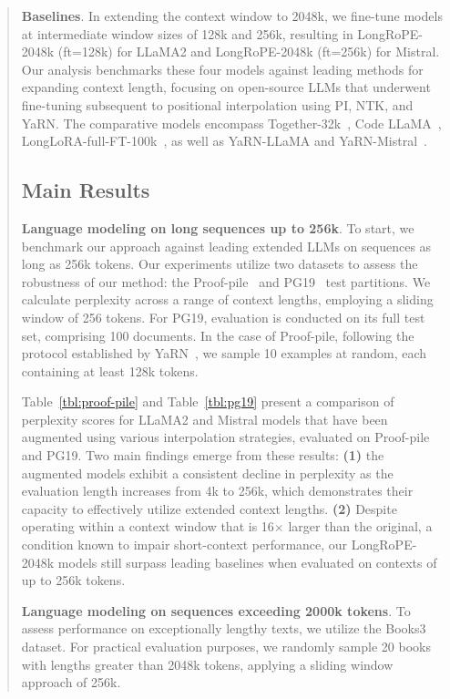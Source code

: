 \begin{abstract}
\textbf{Baselines}. In extending the context window to 2048k, we fine-tune models at intermediate window sizes of 128k and 256k, resulting in LongRoPE-2048k (ft=128k) for LLaMA2 and LongRoPE-2048k (ft=256k) for Mistral. Our analysis benchmarks these four models against leading methods for expanding context length, focusing on open-source LLMs that underwent fine-tuning subsequent to positional interpolation using PI, NTK, and YaRN. The comparative models encompass Together-32k~\cite{together}, Code LLaMA~\cite{codellama}, LongLoRA-full-FT-100k~\cite{longlora}, as well as YaRN-LLaMA and YaRN-Mistral~\cite{yarn}.

\subsection{Main Results}

\label{sec:mainresult}
\textbf{Language modeling on long sequences up to 256k}. To start, we benchmark our approach against leading extended LLMs on sequences as long as 256k tokens. Our experiments utilize two datasets to assess the robustness of our method: the Proof-pile~\cite{pg19} and PG19~\cite{pile} test partitions. We calculate perplexity across a range of context lengths, employing a sliding window of 256 tokens. For PG19, evaluation is conducted on its full test set, comprising 100 documents. In the case of Proof-pile, following the protocol established by YaRN~\cite{yarn}, we sample 10 examples at random, each containing at least 128k tokens.

Table~\ref{tbl:proof-pile} and Table~\ref{tbl:pg19} present a comparison of perplexity scores for LLaMA2 and Mistral models that have been augmented using various interpolation strategies, evaluated on Proof-pile and PG19. Two main findings emerge from these results: \textbf{(1)} the augmented models exhibit a consistent decline in perplexity as the evaluation length increases from 4k to 256k, which demonstrates their capacity to effectively utilize extended context lengths. \textbf{(2)} Despite operating within a context window that is 16$\times$ larger than the original, a condition known to impair short-context performance, our LongRoPE-2048k models still surpass leading baselines when evaluated on contexts of up to 256k tokens.

\textbf{Language modeling on sequences exceeding 2000k tokens}. To assess performance on exceptionally lengthy texts, we utilize the Books3~\cite{pile} dataset. For practical evaluation purposes, we randomly sample 20 books with lengths greater than 2048k tokens, applying a sliding window approach of 256k.


\end{abstract}
